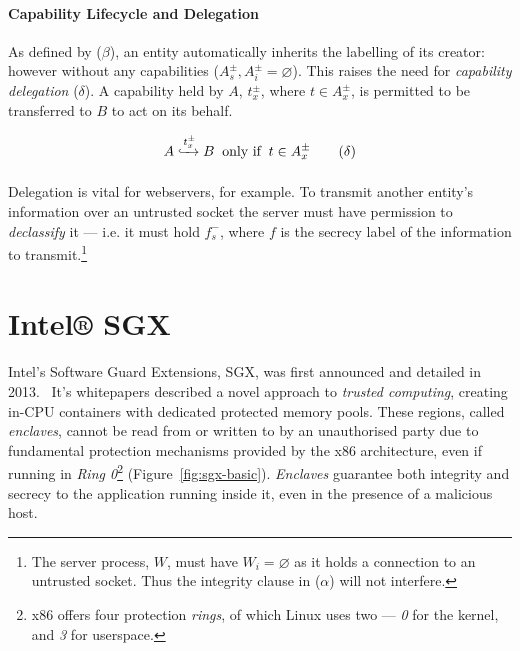 \paragraph{Capability Lifecycle and Delegation} As defined by ($\beta$), an entity automatically inherits the labelling of its creator: however without any capabilities ($A_{s}^{\pm}, A_{i}^{\pm} = \varnothing$). This raises the need for \textit{capability delegation} ($\delta$). A capability held by $A$, $t_{x}^{\pm}$, where $t \in A_{x}^{\pm}$, is permitted to be transferred to $B$ to act on its behalf.

\vspace{-3mm}
\begin{equation}
    A \xhookrightarrow[]{t^{\pm}_{x}} B \;\; \text{only if} \;\; t \in A_{x}^{\pm} \tag{$\delta$}
\end{equation}

\paragraph{} Delegation is vital for webservers, for example. To transmit another entity's information over an untrusted socket the server must have permission to \textit{declassify} it --- i.e. it must hold $f_{s}^{-}$, where $f$ is the secrecy label of the information to transmit.\footnote{The server process, $W$, must have $W_{i} = \varnothing$ as it holds a connection to an untrusted socket. Thus the integrity clause in ($\alpha$) will not interfere.}



\section{Intel® SGX}

\paragraph{} Intel's Software Guard Extensions, SGX, was first announced and detailed in 2013.~\cite{10.1145/2487726.2488370, 10.1145/2487726.2488368, Anati2013InnovativeTF, sgx-sgx-reference} It's whitepapers described a novel approach to \textit{trusted computing}, creating in-CPU containers with dedicated protected memory pools. These regions, called \textit{enclaves}, cannot be read from or written to by an unauthorised party due to fundamental protection mechanisms provided by the x86 architecture, even if running in \textit{Ring 0}\footnote{x86 offers four protection \textit{rings}, of which Linux uses two --- \textit{0} for the kernel, and \textit{3} for userspace.} (Figure~\ref{fig:sgx-basic}). \textit{Enclaves} guarantee both integrity and secrecy to the application running inside it, even in the presence of a malicious host.

